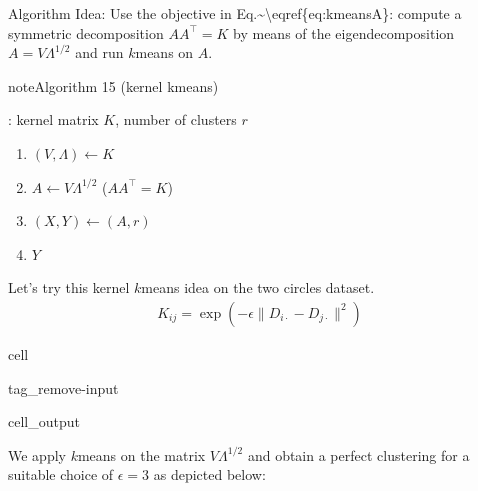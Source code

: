 \documentclass[letterpaper,10pt,english]{jupyterBook}
\begin{document}
\sphinxAtStartPar
Algorithm Idea: Use the objective in Eq.\textasciitilde{}\textbackslash{}eqref\{eq:kmeansA\}: compute a symmetric decomposition \(AA^\top=K\) by means of the eigendecomposition \(A=V\Lambda^{1/2}\) and run \(k\)\sphinxhyphen{}means on \(A\).
\label{clustering_kernel_kmeans:algorithm-4}
\begin{sphinxadmonition}{note}{Algorithm 15 (kernel k\sphinxhyphen{}means)}



\sphinxAtStartPar
{}: kernel matrix \(K\), number of clusters \(r\)
\begin{enumerate}
%
\item {} 
\sphinxAtStartPar
\((V,\Lambda) \gets\)\(K\)

\item {} 
\sphinxAtStartPar
\(A\gets V\Lambda^{1/2}\) (\(AA^\top=K\))

\item {} 
\sphinxAtStartPar
\((X,Y)\gets\)\((A,r)\)

\item {} 
\sphinxAtStartPar
{} \(Y\)

\end{enumerate}
\end{sphinxadmonition}

\sphinxAtStartPar
Let’s try this kernel \(k\)\sphinxhyphen{}means idea on the two circles dataset.
\begin{equation*}
\begin{split}K_{ij}=\exp\left(-\epsilon\lVert D_{i\cdot} -D_{j\cdot}\rVert^2\right)\end{split}
\end{equation*}

\begin{sphinxuseclass}{cell}
\begin{sphinxuseclass}{tag_remove-input}\begin{sphinxVerbatimOutput}

\begin{sphinxuseclass}{cell_output}
\noindent{}

\end{sphinxuseclass}\end{sphinxVerbatimOutput}

\end{sphinxuseclass}
\end{sphinxuseclass}
\sphinxAtStartPar
We apply \(k\)\sphinxhyphen{}means on the matrix \(V\Lambda^{1/2}\) and obtain a perfect clustering for a suitable choice of \(\epsilon=3\) as depicted below:
\end{document}
